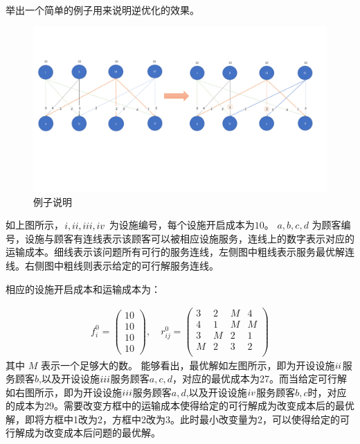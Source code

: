 \documentclass[UTF8]{article}
\begin{document}
举出一个简单的例子用来说明逆优化的效果。
\begin{figure}[h]
\centering
\includegraphics[width=1\textwidth]{Graph}
\caption{例子说明}
\end{figure}

如上图所示，$\uppercase\expandafter{\romannumeral1},\uppercase\expandafter{\romannumeral2},\uppercase\expandafter{\romannumeral3},\uppercase\expandafter{\romannumeral4}$ 为设施编号，每个设施开启成本为$10$。
$a,b,c,d$ 为顾客编号，设施与顾客有连线表示该顾客可以被相应设施服务，连线上的数字表示对应的运输成本。细线表示该问题所有可行的服务连线，左侧图中粗线表示服务最优解连线。右侧图中粗线则表示给定的可行解服务连线。

相应的设施开启成本和运输成本为：

$$
\begin{gathered}
f_i^0 = \begin{pmatrix} 10 \\ 10 \\ 10 \\ 10  \end{pmatrix},
\quad
r_{ij}^0 = \begin{pmatrix} 3 & 2 & M & 4 \\
                          4 & 1 & M & M \\
                          3 & M & 2 & 1 \\
                          M & 2 & 3 & 2 \\
            \end{pmatrix}
\end{gathered}
$$
其中 $M$ 表示一个足够大的数。
能够看出，最优解如左图所示，即为开设设施$\uppercase\expandafter{\romannumeral2}$服务顾客$b$,以及开设设施$\uppercase\expandafter{\romannumeral3}$服务顾客$a,c,d$，对应的最优成本为27。而当给定可行解如右图所示，即为开设设施$\uppercase\expandafter{\romannumeral3}$服务顾客$a,d$,以及开设设施$\uppercase\expandafter{\romannumeral4}$服务顾客$b,c$时，对应的成本为29。需要改变方框中的运输成本使得给定的可行解成为改变成本后的最优解，即将方框中1改为2，方框中2改为3。此时最小改变量为2，可以使得给定的可行解成为改变成本后问题的最优解。
\end{document}
